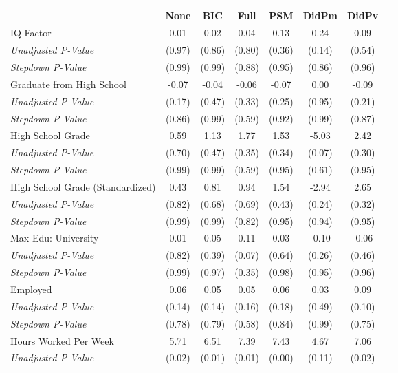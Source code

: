 \begin{tabular}{l c c c c c c c}
\toprule
 & None & BIC & Full & PSM & DidPm & DidPv \\
\midrule
IQ Factor & 0.01 & 0.02 & 0.04 & 0.13 & 0.24 & 0.09 \\
\quad \textit{Unadjusted P-Value} & (0.97) & (0.86) & (0.80) & (0.36) & (0.14) & (0.54) \\
\quad \textit{Stepdown P-Value} & (0.99) & (0.99) & (0.88) & (0.95) & (0.86) & (0.96) \\
Graduate from High School & -0.07 & -0.04 & -0.06 & -0.07 & 0.00 & -0.09 \\
\quad \textit{Unadjusted P-Value} & (0.17) & (0.47) & (0.33) & (0.25) & (0.95) & (0.21) \\
\quad \textit{Stepdown P-Value} & (0.86) & (0.99) & (0.59) & (0.92) & (0.99) & (0.87) \\
High School Grade & 0.59 & 1.13 & 1.77 & 1.53 & -5.03 & 2.42 \\
\quad \textit{Unadjusted P-Value} & (0.70) & (0.47) & (0.35) & (0.34) & (0.07) & (0.30) \\
\quad \textit{Stepdown P-Value} & (0.99) & (0.99) & (0.59) & (0.95) & (0.61) & (0.95) \\
High School Grade (Standardized) & 0.43 & 0.81 & 0.94 & 1.54 & -2.94 & 2.65 \\
\quad \textit{Unadjusted P-Value} & (0.82) & (0.68) & (0.69) & (0.43) & (0.24) & (0.32) \\
\quad \textit{Stepdown P-Value} & (0.99) & (0.99) & (0.82) & (0.95) & (0.94) & (0.95) \\
Max Edu: University & 0.01 & 0.05 & 0.11 & 0.03 & -0.10 & -0.06 \\
\quad \textit{Unadjusted P-Value} & (0.82) & (0.39) & (0.07) & (0.64) & (0.26) & (0.46) \\
\quad \textit{Stepdown P-Value} & (0.99) & (0.97) & (0.35) & (0.98) & (0.95) & (0.96) \\
Employed & 0.06 & 0.05 & 0.05 & 0.06 & 0.03 & 0.09 \\
\quad \textit{Unadjusted P-Value} & (0.14) & (0.14) & (0.16) & (0.18) & (0.49) & (0.10) \\
\quad \textit{Stepdown P-Value} & (0.78) & (0.79) & (0.58) & (0.84) & (0.99) & (0.75) \\
Hours Worked Per Week & 5.71 & 6.51 & 7.39 & 7.43 & 4.67 & 7.06 \\
\quad \textit{Unadjusted P-Value} & (0.02) & (0.01) & (0.01) & (0.00) & (0.11) & (0.02) \\

\end{tabular}
